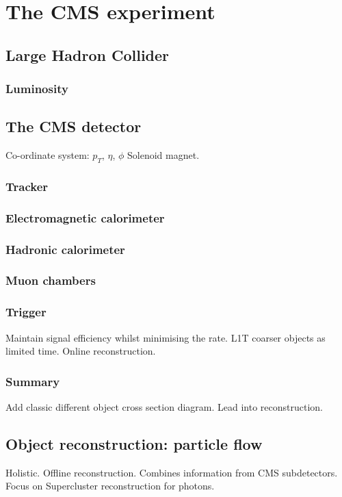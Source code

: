 \chapter{The CMS experiment}
\label{chap:cms}

\section{Large Hadron Collider}

\subsection{Luminosity}

\section{The CMS detector}
Co-ordinate system: $p_T$, $\eta$, $\phi$
Solenoid magnet.

\subsection{Tracker}

\subsection{Electromagnetic calorimeter}

\subsection{Hadronic calorimeter}

\subsection{Muon chambers}

\subsection{Trigger}\label{sec:trigger}
Maintain signal efficiency whilst minimising the rate. L1T coarser objects as limited time. Online reconstruction.

\subsection{Summary}
Add classic different object cross section diagram. Lead into reconstruction.

\section{Object reconstruction: particle flow}\label{sec:particle_flow}
Holistic.
Offline reconstruction. Combines information from CMS subdetectors. Focus on Supercluster reconstruction for photons.

